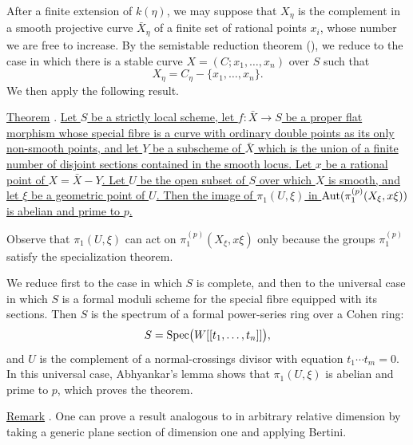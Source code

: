 After a finite extension of $k(\eta)$, we may suppose that $X_\eta$ is
the complement in a smooth projective curve $\bar X_\eta$ of a finite
set of rational points $x_i$, whose number we are free to increase. By
the semistable reduction theorem (), we reduce to the case in which
there is a stable curve $X=(C;x_1,\ldots,x_n)$ over $S$ such that
\[
X_\eta=C_\eta-\{x_1,\ldots,x_n\}.
\]
We then apply the following result.


\underline{Theorem} . \underline{Let $S$ be a strictly local scheme,
let $f:\bar X\longrightarrow S$ be a proper flat morphism whose special
fibre is a curve with ordinary double points as its only non-smooth
points, and let $Y$ be a subscheme of $\bar X$ which is the union of a
finite number of disjoint sections contained in the smooth locus. Let
$x$ be a rational point of $X=\bar X-Y$. Let $U$ be the open subset of
$S$ over which $X$ is smooth, and let $\xi$ be a geometric point of $U$.
Then the image of $\pi_1(U,\xi)$ in
$\operatorname{Aut}(\pi_1^{(p)}(X_\xi,x\xi))$ is abelian and prime to $p$.}

Observe that $\pi_1(U,\xi)$ can act on
$\pi_1^{(p)}(X_\xi,x\xi)$ only because the groups $\pi_1^{(p)}$
satisfy the specialization theorem.

We reduce first to the case in which $S$ is complete, and then to the
universal case in which $S$ is a formal moduli scheme for the special
fibre equipped with its sections. Then $S$ is the spectrum of a formal
power-series ring over a Cohen ring:
\[
S=\operatorname{Spec}\bigl(W[[t_1,\ldots,t_n]]\bigr),
\]
and $U$ is the complement of a normal-crossings divisor with equation
$t_1\cdots t_m=0$. In this universal case, Abhyankar's lemma shows that
$\pi_1(U,\xi)$ is abelian and prime to $p$, which proves the theorem.

\underline{Remark} . One can prove a result analogous to  in
arbitrary relative dimension by taking a generic plane section of
dimension one and applying Bertini.

